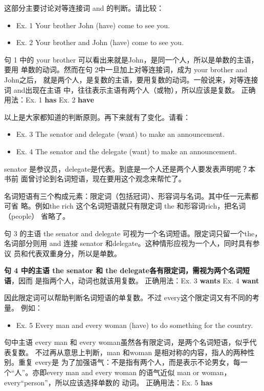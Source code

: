 这部分主要讨论对等连接词 and 的判断。请比较：
\begin{mybox}
  \begin{itemize}
  \item   Ex. 1 Your brother John (have) come to see you.
  \item   Ex. 2 Your brother and John (have) come to see you.
  \end{itemize}
  句 1 中的 your brother 可以看出来就是John，是同一个人，所以是单数的主语，要用
  单数的动词。然而在句 2中一旦加上对等连接词，成为 your brother and John之后，
  就是两个人，是复数的主语，要用复数的动词。一般说来，对等连接词 and出现在主语
  中，往往表示主语有两个人（或物），所以应该是复数。
  \tcblower
  正确用法：Ex. 1 \textbf{has} \qquad\qquad Ex. 2 \textbf{have}
\end{mybox}

以上是大家都知道的判断原则。再下来就有了变化。请看：

\begin{mybox}

  \begin{itemize}
  \item   Ex. 3 The senator and delegate (want) to make an announcement.
  \item   Ex. 4 The senator and the delegate (want) to make an announcement.
  \end{itemize}
  senator 是参议员，delegate是代表。到底是一个人还是两个人要发表声明呢？本书前
  面曾讨论到名词短语，现在要用这个观念来帮忙了。

  名词短语有三个构成元素：限定词（包括冠词）、形容词与名词。其中任一元素都可省
  略。例如the rich 这个名词短语就只有限定词 the 和形容词rich，把名词（people）
  省略了。

  句 3 的主语 the senator and delegate 可视为一个名词短语。限定词只留一个the，
  名词部分则用 and 连接 senator 和delegate。这种情形应视为一个人，同时具有参议
  员和代表双重身分，所以是单数。

  \textbf{句 4 中的主语 the senator 和 the delegate各有限定词，需视为两个名词短语}，因而
  是指两个人，动词也就该用复数。
  \tcblower
  正确用法：Ex. 3 \textbf{wants} \qquad\quad Ex. 4 \textbf{want}
\end{mybox}

因此限定词可以帮助判断名词短语的单复数。不过 every这个限定词又有不同的考量。
例如：
\begin{mybox}
  \begin{itemize}
  \item Ex. 5 Every man and every woman (have) to do something for the country.
  \end{itemize}
  句中主语 every man 和 every woman虽然各有限定词，是两个名词短语，似乎代表复数。
  不过再从意思上判断，man 和woman 是相对称的内容，指人的两种性别。重复 every是
  为了加强语气：不是指有两个人，而是表示不论男女，每一个“人”。亦即every man
  and every woman 的语气近似 man or woman，every“person”，所以应该选择单数的
  动词。
  \tcblower
  正确用法：Ex. 5 \textbf{has}
\end{mybox}

